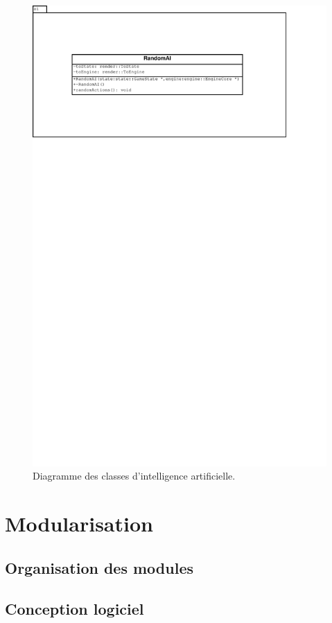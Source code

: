 \documentclass[a4paper,12pt]{article}
\begin{document}
\begin{landscape}
\begin{figure}[p]
\includegraphics[width=0.9\paperheight]{ai.pdf}
\caption{\label{uml:ai}Diagramme des classes d'intelligence artificielle.} 
\end{figure}
\end{landscape}


\section{Modularisation}
\label{sec:module}

\subsection{Organisation des modules}

\clearpage
\subsection{Conception logiciel}


%
\end{document}
